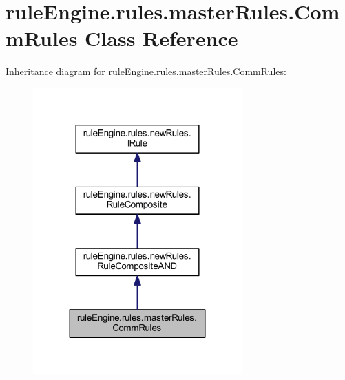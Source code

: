 \hypertarget{classrule_engine_1_1rules_1_1master_rules_1_1_comm_rules}{}\section{rule\+Engine.\+rules.\+master\+Rules.\+Comm\+Rules Class Reference}
\label{classrule_engine_1_1rules_1_1master_rules_1_1_comm_rules}


Inheritance diagram for rule\+Engine.\+rules.\+master\+Rules.\+Comm\+Rules\+:
\nopagebreak
\begin{figure}[H]
\begin{center}
\leavevmode
\includegraphics[width=227pt]{classrule_engine_1_1rules_1_1master_rules_1_1_comm_rules__inherit__graph}
\end{center}
\end{figure}



